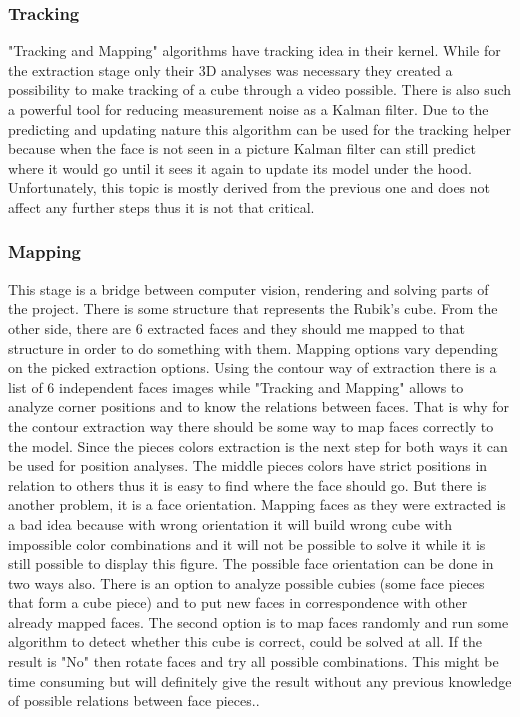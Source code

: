 \documentclass[../../main.tex]{subfiles}
\begin{document}
\subsubsection*{Tracking}

"Tracking and Mapping" algorithms have tracking idea in their kernel. While for the extraction stage only their 3D analyses was necessary they created a possibility to make tracking of a cube through a video possible. There is also such a powerful tool for reducing measurement noise as a Kalman filter. Due to the predicting and updating nature this algorithm can be used for the tracking helper because when the face is not seen in a picture Kalman filter can still predict where it would go until it sees it again to update its model under the hood. Unfortunately, this topic is mostly derived from the previous one and does not affect any further steps thus it is not that critical.

\subsubsection*{Mapping}

This stage is a bridge between computer vision, rendering and solving parts of the project. There is some structure that represents the Rubik's cube. From the other side, there are 6 extracted faces and they should me mapped to that structure in order to do something with them. Mapping options vary depending on the picked extraction options. Using the contour way of extraction there is a list of 6 independent faces images while "Tracking and Mapping" allows to analyze corner positions and to know the relations between faces. That is why for the contour extraction way there should be some way to map faces correctly to the model. Since the pieces colors extraction is the next step for both ways it can be used for position analyses. The middle pieces colors have strict positions in relation to others thus it is easy to find where the face should go. But there is another problem, it is a face orientation. Mapping faces as they were extracted is a bad idea because with wrong orientation it will build wrong cube with impossible color combinations and it will not be possible to solve it while it is still possible to display this figure. The possible face orientation can be done in two ways also. There is an option to analyze possible cubies (some face pieces that form a cube piece) and to put new faces in correspondence with other already mapped faces. The second option is to map faces randomly and run some algorithm to detect whether this cube is correct, could be solved at all. If the result is "No" then rotate faces and try all possible combinations. This might be time consuming but will definitely give the result without any previous knowledge of possible relations between face pieces..
\end{document}
